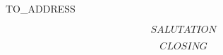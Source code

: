 \documentclass[$$DOCUMENTCLASSOPTIONS$$]{scrlttr2}
\begin{document}

\begin{letter}{TO_ADDRESS}
\address{$$ADDRESS$$}

\opening{$$SALUTATION$$}




\signature{$$AUTHOR$$\\$$TITLE$$}

\closing{$$CLOSING$$}


\end{letter}
\end{document}

